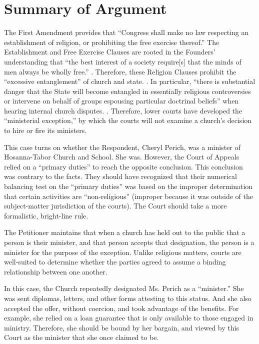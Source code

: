 \documentclass[12pt,\documentclassflag]{FRAP_Brief}
\begin{document}
\section{Summary of Argument}

The First Amendment provides that ``Congress shall make no law respecting an establishment of religion, or prohibiting the free exercise thereof.'' The Establishment and Free Exercise Clauses are rooted in the Founders' understanding that ``the best interest of a society require[s] that the minds of men always be wholly free.'' . Therefore, these Religion Clauses prohibit the ``excessive entanglement'' of church and state.  \See {}. In particular, ``there is substantial danger that the State will become entangled in essentially religious controversies or intervene on behalf of groups espousing particular doctrinal beliefs'' when hearing internal church disputes. . Therefore, lower courts have developed the ``ministerial exception,'' by which the courts will not examine a church's decision to hire or fire its ministers.

This case turns on whether the Respondent, Cheryl Perich, was a minister of Hosanna-Tabor Church and School. She was. However, the Court of Appeals relied on a ``primary duties'' to reach the opposite conclusion. This conclusion was contrary to the facts. They should have recognized that their numerical balancing test on the ``primary duties'' was based on the improper determination that certain activities are ``non-religious'' (improper because it was outside of the subject-matter jurisdiction of the courts). The Court should take a more formalistic, bright-line rule.

The Petitioner maintains that when a church has held out to the public that a person is their minister, and that person accepts that designation, the person is a minister for the purpose of the exception. Unlike religious matters, courts are well-suited to determine whether the parties agreed to assume a binding relationship between one another.

In this case, the Church repeatedly designated Ms. Perich as a ``minister.'' She was sent diplomas, letters, and other forms attesting to this status. And she also accepted the offer, without coercion, and took advantage of the benefits. For example, she relied on a loan guarantee that is only available to those engaged in ministry. Therefore, she should be bound by her bargain, and viewed by this Court as the minister that she once claimed to be.
\end{document}
